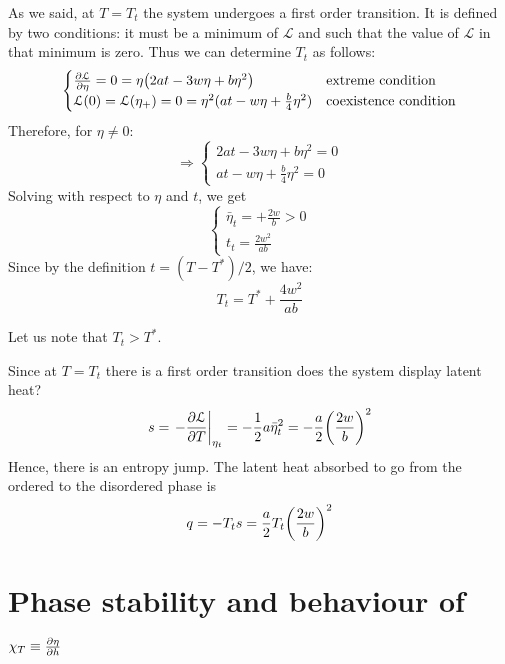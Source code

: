 \documentclass[../main/main.tex]{subfiles}
\begin{document}
  As we said, at \( T=T_t \) the system undergoes a first order transition. It is defined by two conditions: it must be a minimum of \( \mathcal{L} \) and such that the value of \( \mathcal{L} \) in that minimum is zero.  Thus we can determine \( T_t \) as follows:
  \begin{equation*}
    \begin{cases}
     \pdv{\mathcal{L}}{\eta } = 0 = \eta \qty(2 a t - 3 w \eta +  b \eta ^2)  & \text{extreme condition}\\
    \mathcal{L} ( 0 ) = \mathcal{L} ( \eta _+)=0 = \eta ^2 (a t - w \eta + \frac{b}{4} \eta ^2)& \text{coexistence condition}
    \end{cases}
  \end{equation*}
  Therefore, for \( \eta \neq 0 \):
  \begin{equation*}
  \Rightarrow
    \begin{cases}
     2 a t - 3 w \eta +  b \eta ^2 = 0\\
     a t - w \eta + \frac{b}{4} \eta ^2 = 0
    \end{cases}
  \end{equation*}
  Solving with respect to \( \eta  \)  and \( t \), we get
  \begin{equation*}
    \begin{cases}
     \bar{\eta }_{t} = + \frac{2w}{b} >0 \\
      t_t = \frac{2w^2}{ab}
    \end{cases}
  \end{equation*}
Since by the definition \( t = (T-T^*)/2 \), we have:
  \begin{equation}
    T_t = T^* + \frac{4w^2}{ab}
  \end{equation}
  \begin{remark}
  Let us note that \( T_t >T^* \).
  \end{remark}
  Since at \( T= T_t \) there is a first order transition does the system display latent heat?
  \begin{equation*}
    s = \eval{- \pdv{\mathcal{L}}{T} }_{\eta _t} = - \frac{1}{2} a \bar{\eta }_t^2 = - \frac{a}{2} \qty(\frac{2w}{b})^2
  \end{equation*}
  Hence, there is an entropy jump.
  The latent heat absorbed to go from the ordered to the disordered phase is
  \begin{equation}
    q = - T_t s = \frac{a}{2} T_t \qty(\frac{2w}{b})^2
  \end{equation}


\section{Phase stability and behaviour of \( \chi _T \equiv \pdv{\eta }{h}  \)}
\end{document}
